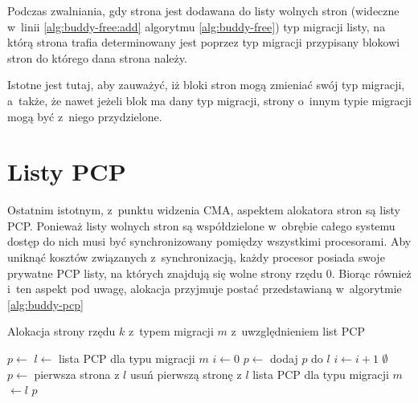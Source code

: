 Podczas zwalniania, gdy strona jest dodawana do listy wolnych stron
(wideczne w~linii \ref{alg:buddy-free:add} algorytmu
\ref{alg:buddy-free}) typ migracji listy, na którą strona trafia
determinowany jest poprzez typ migracji przypisany blokowi stron do
którego dana strona należy.

Istotne jest tutaj, aby zauważyć, iż bloki stron mogą zmieniać swój
typ migracji, a~także, że nawet jeżeli blok ma dany typ migracji,
strony o~innym typie migracji mogą być z~niego przydzielone.


\section{Listy PCP}\label{sec:pcp-lists}

Ostatnim istotnym, z~punktu widzenia CMA, aspektem alokatora stron są
listy PCP.  Ponieważ listy wolnych stron są współdzielone w~obrębie
całego systemu dostęp do nich musi być synchronizowany pomiędzy
wszystkimi procesorami.  Aby uniknąć kosztów związanych
z~synchronizacją, każdy procesor posiada swoje prywatne PCP listy, na
których znajdują się wolne strony rzędu 0.  Biorąc również i~ten
aspekt pod uwagę, alokacja przyjmuje postać przedstawianą w~algorytmie
\ref{alg:buddy-pcp}

\begin{algorithm}
\caption{Alokacja strony rzędu $k$ z~typem migracji $m$
  z~uwzględnieniem list PCP}
\label{alg:buddy-pcp}
\begin{algorithmic}[1]
        \State $p \gets$ 
    \Else
        \State $l \gets$ lista PCP dla typu migracji $m$
            \State $i \gets 0$
            \Repeat
                \State $p \gets$ 
                    \State dodaj $p$ do $l$
                    \State $i \gets i + 1$
                \EndIf
             
        \EndIf
            \State \Return $\emptyset$
        \Else
            \State $p \gets$ pierwsza strona z $l$
            \State usuń pierwszą stronę z $l$
            \State lista PCP dla typu migracji $m$ $\gets l$
        \EndIf
    \EndIf
    \State \Return $p$
\EndFunction
\end{algorithmic}
\end{algorithm}
